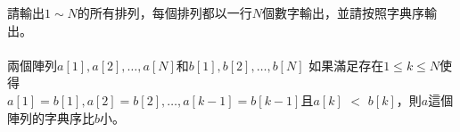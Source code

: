 請輸出$1\sim N$的所有排列，每個排列都以一行$N$個數字輸出，並請按照字典序輸出。\\
\\
兩個陣列$a[1], a[2], \ldots, a[N]$和$b[1], b[2], \ldots, b[N]$ 如果滿足存在$1\le k\le N$使得\\
$a[1] = b[1], a[2] = b[2], \ldots, a[k - 1] = b[k - 1]$且$a[k]$ $<$ $b[k]$，則$a$這個陣列的字典序比$b$小。\\
